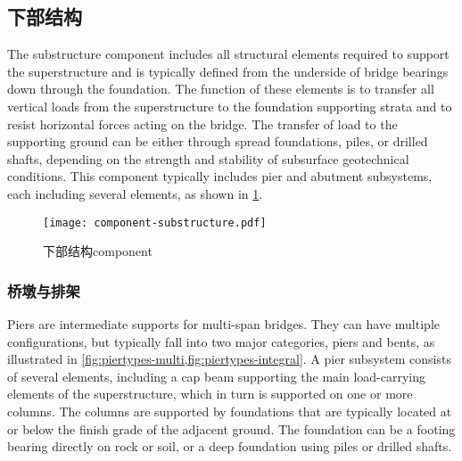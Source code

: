 \subsection{下部结构}

The substructure component includes all structural elements required to support the superstructure and is typically defined from the underside of bridge bearings down through the foundation. The function of these elements is to transfer all vertical loads from the superstructure to the foundation supporting strata and to resist horizontal forces acting on the bridge. The transfer of load to the supporting ground can be either through spread foundations, piles, or drilled shafts, depending on the strength and stability of subsurface geotechnical conditions. This component typically includes pier and abutment subsystems, each including several elements, as shown in \cref{fig:substructure-component}.

\begin{figure}
  \texttt{[image: component-substructure.pdf]}
  \caption{下部结构\gls*{component}}
  \label{fig:substructure-component}
\end{figure}

\subsubsection{桥墩与排架}

Piers are intermediate supports for multi-span bridges. They can have multiple configurations, but typically fall into two major categories, piers and bents, as illustrated in \cref{fig:piertypes-multi,fig:piertypes-integral}. A pier subsystem consists of several elements, including a cap beam supporting the main load-carrying elements of the superstructure, which in turn is supported on one or more columns. The columns are supported by foundations that are typically located at or below the finish grade of the adjacent ground. The foundation can be a footing bearing directly on rock or soil, or a deep foundation using piles or drilled shafts.

